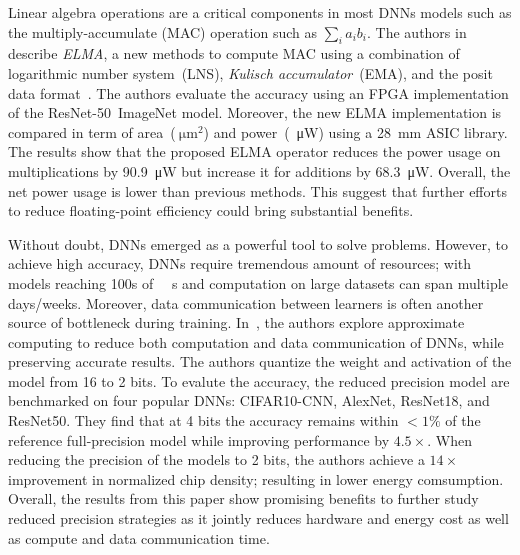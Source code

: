 Linear algebra operations are a critical components in most DNNs models such as 
the multiply-accumulate (MAC) operation such as $\sum_{i}a_{i}b_{i}$.
The authors in~\cite{Johnson2018-up} describe \textit{ELMA}, a new methods to compute MAC using a combination of logarithmic 
number system~(LNS), \textit{Kulisch accumulator}~(EMA), and the posit data format~\cite{Gustafson2017-wo}.
The authors evaluate the accuracy using an FPGA implementation of the ResNet-50~ImageNet model.
Moreover, the new ELMA implementation is compared in term of area~($\SI{}{\micro\metre}^2$)
and power~(\SI{}{\micro\watt}) using a \SI{28}{\milli\metre} ASIC library.
The results show that the proposed ELMA operator reduces the power usage on 
multiplications by \SI{90.9}{\micro\watt} but increase it for additions by \SI{68.3}{\micro\watt}.
Overall, the net power usage is lower than previous methods.
This suggest that further efforts to reduce floating-point efficiency could bring substantial benefits.

Without doubt, DNNs emerged as a powerful tool to solve problems.
However, to achieve high accuracy, DNNs require tremendous amount of resources;
with models reaching 100s of \SI{}{\mega\byte}s and computation on large datasets can span multiple days/weeks.
Moreover, data communication between learners is often another source of bottleneck during training. 
In~\cite{Chen2018-an}, the authors explore approximate computing to reduce both 
computation and data communication of DNNs, while preserving accurate results.
The authors quantize the weight and activation of the model from 16 to 2 bits.
To evalute the accuracy, the reduced precision model are benchmarked  on four popular DNNs: CIFAR10-CNN, AlexNet, ResNet18, and ResNet50.
They find that at 4 bits the accuracy remains within $<1\%$ of the reference 
full-precision model while improving performance by $4.5\times$.
When reducing the precision of the models to 2 bits, the authors achieve a $14\times$
improvement in normalized chip density; resulting in lower energy comsumption.
Overall, the results from this paper show promising benefits to further study reduced 
precision strategies as it jointly reduces hardware and energy cost as well as compute and data communication time.

